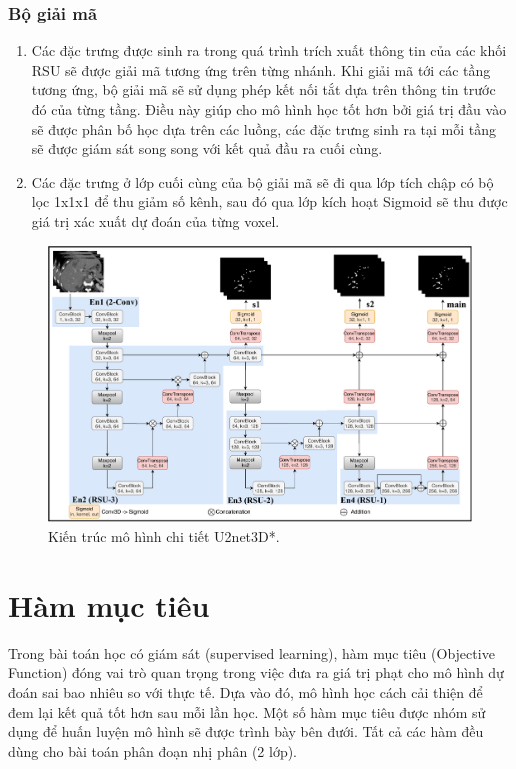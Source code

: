 \subsubsection{Bộ giải mã}
\begin{enumerate}
    \item Các đặc trưng được sinh ra trong quá trình trích xuất thông tin của các khối RSU sẽ được giải mã tương ứng trên từng nhánh. Khi giải mã tới các tầng tương ứng, bộ giải mã sẽ sử dụng phép kết nối tắt dựa trên thông tin trước đó của từng tầng. Điều này giúp cho mô hình học tốt hơn bởi giá trị đầu vào sẽ được phân bố học dựa trên các luồng, các đặc trưng sinh ra tại mỗi tầng sẽ được giám sát song song với kết quả đầu ra cuối cùng.
    \item Các đặc trưng ở lớp cuối cùng của bộ giải mã sẽ đi qua lớp tích chập có bộ lọc 1x1x1 để thu giảm số kênh, sau đó qua lớp kích hoạt Sigmoid sẽ thu được giá trị xác xuất dự đoán của từng voxel.
\end{enumerate}

\begin{figure}[H]
    \centering
    \includegraphics[angle=90,scale=0.6]{images/blood/u2net3d_arch.pdf}
    \caption{Kiến trúc mô hình chi tiết U2net3D*.}
    \label{fig:u2net3d-arch}
\end{figure}

\section{Hàm mục tiêu}
Trong bài toán học có giám sát (supervised learning), hàm mục tiêu (Objective Function) đóng vai trò quan trọng trong việc đưa ra giá trị phạt cho mô hình dự đoán sai bao nhiêu so với thực tế. Dựa vào đó, mô hình học cách cải thiện để đem lại kết quả tốt hơn sau mỗi lần học. Một số hàm mục tiêu được nhóm sử dụng để huấn luyện mô hình sẽ được trình bày bên đưới. Tất cả các hàm đều dùng cho bài toán phân đoạn nhị phân (2 lớp).

